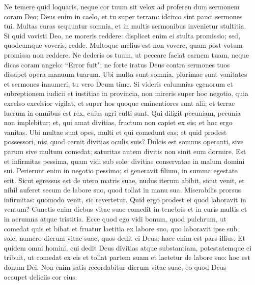 \begin{biblechapter}  
\verse Ne temere quid loquaris, neque cor tuum sit velox ad proferen dum sermonem coram Deo; Deus enim in caelo, et tu super terram: idcirco sint pauci sermones tui. 
\verse Multas curas sequuntur somnia, et in multis sermonibus invenietur stultitia. 
\verse Si quid vovisti Deo, ne moreris reddere: displicet enim ei stulta promissio; sed, quodcumque voveris, redde. 
\verse Multoque melius est non vovere, quam post votum promissa non reddere. 
\verse Ne dederis os tuum, ut peccare faciat carnem tuam, neque dicas coram angelo: “Error fuit"; ne forte iratus Deus contra sermones tuos dissipet opera manuum tuarum. 
\verse Ubi multa sunt somnia, plurimae sunt vanitates et sermones innumeri; tu vero Deum time. 
\verse Si videris calumnias egenorum et subreptionem iudicii et iustitiae in provincia, non mireris super hoc negotio, quia excelso excelsior vigilat, et super hos quoque eminentiores sunt alii; 
\verse et terrae lucrum in omnibus est rex, cuius agri culti sunt. 
\verse Qui diligit pecuniam, pecunia non implebitur; et, qui amat divitias, fructum non capiet ex eis; et hoc ergo vanitas. 
\verse Ubi multae sunt opes, multi et qui comedunt eas; et quid prodest possessori, nisi quod cernit divitias oculis suis? 
\verse Dulcis est somnus operanti, sive parum sive multum comedat; saturitas autem divitis non sinit eum dormire. 
\verse Est et infirmitas pessima, quam vidi sub sole: divitiae conservatae in malum domini sui. 
\verse Perierunt enim in negotio pessimo; si generavit filium, in summa egestate erit. 
\verse Sicut egressus est de utero matris suae, nudus iterum abibit, sicut venit, et nihil auferet secum de labore suo, quod tollat in manu sua. 
\verse Miserabilis prorsus infirmitas: quomodo venit, sic revertetur. Quid ergo prodest ei quod laboravit in ventum? 
\verse Cunctis enim diebus vitae suae comedit in tenebris et in curis multis et in aerumna atque tristitia.  
\verse Ecce quod ego vidi bonum, quod pulchrum, ut comedat quis et bibat et fruatur laetitia ex labore suo, quo laboravit ipse sub sole, numero dierum vitae suae, quos dedit ei Deus; haec enim est pars illius. 
\verse Et quidem omni homini, cui dedit Deus divitias atque substantiam, potestatemque ei tribuit, ut comedat ex eis et tollat partem suam et laetetur de labore suo: hoc est donum Dei. 
\verse Non enim satis recordabitur dierum vitae suae, eo quod Deus occupet deliciis cor eius. 
\end{biblechapter}

